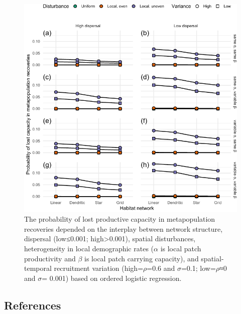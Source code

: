 \documentclass[
]{article}
\begin{document}
\begin{figure}[H]

{\centering \includegraphics{Managing_for_ecological_surprises_in_metapopulations_files/figure-latex/conditional probability for lost capacity-1} 

}

\caption{The probability of lost productive capacity in metapopulation recoveries depended on the interplay between network structure, dispersal (low≤0.001; high>0.001), spatial disturbances, heterogeneity in local demographic rates ($\alpha$ is local patch productivity and $\beta$ is local patch carrying capacity), and spatial-temporal recruitment variation (high=$\rho$=0.6 and $\sigma$=0.1; low=$\rho$≈0 and $\sigma$= 0.001) based on ordered logistic regression.}\label{fig:conditional probability for lost capacity}
\end{figure}

\hypertarget{references}{%
\subsection{References}\label{references}}

\vspace{3truemm}
\end{document}
